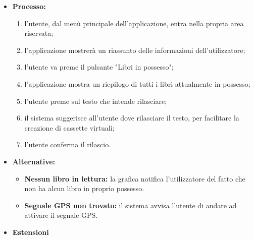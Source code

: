 \begin{itemize}
\begin{itemize}
		\item \textbf{Processo:}
		\begin{enumerate}
			\item l'utente, dal menù principale dell'applicazione, entra nella propria area riservata;
			\item l'applicazione mostrerà un riassunto delle informazioni dell'utilizzatore;
			\item l'utente va preme il pulsante "Libri in possesso";
			\item l'applicazione mostra un riepilogo di tutti i libri attualmente in possesso;
			\item  l'utente preme sul testo che intende rilasciare;
			\item il sistema suggerisce all'utente dove rilasciare il testo, per facilitare la creazione di cassette virtuali;
			\item l'utente conferma il rilascio.
		\end{enumerate}
		\item \textbf{Alternative:}
		\begin{itemize}
			\item \textbf{Nessun libro in lettura:} la grafica notifica l'utilizzatore del fatto che non ha alcun libro in proprio possesso.
			\item \textbf{Segnale GPS non trovato:} il sistema avvisa l'utente di andare ad attivare il segnale GPS.
		\end{itemize}
		\item \textbf{Estensioni}
	\end{itemize}
\end{itemize}